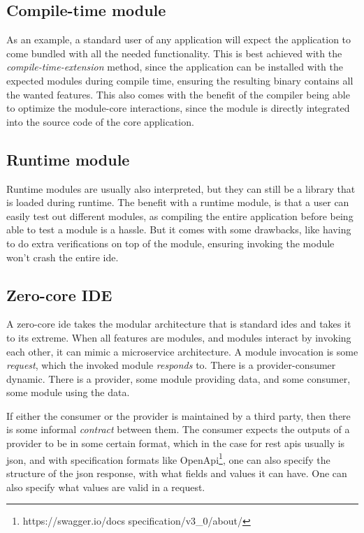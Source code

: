 \subsection{Compile-time module}

As an example, a standard user of any application will expect the application to
come bundled with all the needed functionality. This is best achieved with the
\textit{compile-time-extension} method, since the application can be installed
with the expected modules during compile time, ensuring the resulting binary
contains all the wanted features. This also comes with the benefit of the
compiler being able to optimize the module-core interactions, since the module
is directly integrated into the source code of the core application.

\subsection{Runtime module}

Runtime modules are usually also interpreted, but they can still be a
library that is loaded during runtime. The benefit with a runtime module,
is that a user can easily test out different modules, as compiling the entire
application before being able to test a module is a hassle. But it comes with
some drawbacks, like having to do extra verifications on top of the module,
ensuring invoking the module won't crash the entire \gls*{ide}.


\subsection{Zero-core IDE}

A zero-core \gls*{ide} takes the modular architecture that is standard
\gls*{ide}s and takes it to its extreme. When all features are modules, and
modules interact by invoking each other, it can mimic a microservice
architecture. A module invocation is some \textit{request}, which the invoked
module \textit{responds} to. There is a provider-consumer dynamic. There is a
provider, some module providing data, and some consumer, some module using the
data.

If either the consumer or the provider is maintained by a third party, then
there is some informal \textit{contract} between them. The consumer expects the
outputs of a provider to be in some certain format, which in the case for
\gls*{rest} \gls*{api}s usually is \gls*{json}, and with specification formats
like OpenApi\footnote{https://swagger.io/docs specification/v3\_0/about/}, one
can also specify the structure of the \gls*{json} response, with what fields and
values it can have. One can also specify what values are valid in a request.

